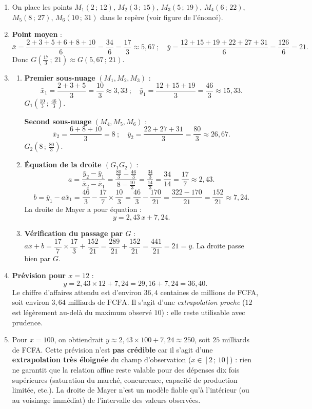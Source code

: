 \documentclass[11pt]{article}
\begin{document}
\begin{corrige}
\begin{enumerate}
    \item On place les points $M_1(2\,;\,12)$, $M_2(3\,;\,15)$, $M_3(5\,;\,19)$, $M_4(6\,;\,22)$, $M_5(8\,;\,27)$, $M_6(10\,;\,31)$ dans le repère (voir figure de l'énoncé).
    \item \textbf{Point moyen} :
    \[ \bar{x}=\frac{2+3+5+6+8+10}{6}=\frac{34}{6}=\frac{17}{3}\approx 5{,}67\ ;\quad \bar{y}=\frac{12+15+19+22+27+31}{6}=\frac{126}{6}=21. \]
    Donc $\boxed{G\left(\frac{17}{3}\,;\,21\right)\approx G(5{,}67\,;\,21)}$.
    \item \begin{enumerate}
        \item \textbf{Premier sous-nuage} $(M_1, M_2, M_3)$ :
        \[ \bar{x}_1=\frac{2+3+5}{3}=\frac{10}{3}\approx 3{,}33\ ;\quad \bar{y}_1=\frac{12+15+19}{3}=\frac{46}{3}\approx 15{,}33. \]
        $\boxed{G_1\left(\frac{10}{3}\,;\,\frac{46}{3}\right)}$.
        
        \textbf{Second sous-nuage} $(M_4, M_5, M_6)$ :
        \[ \bar{x}_2=\frac{6+8+10}{3}=8\ ;\quad \bar{y}_2=\frac{22+27+31}{3}=\frac{80}{3}\approx 26{,}67. \]
        $\boxed{G_2\left(8\,;\,\frac{80}{3}\right)}$.
        \item \textbf{Équation de la droite $(G_1G_2)$} :
        \[ a=\frac{\bar{y}_2-\bar{y}_1}{\bar{x}_2-\bar{x}_1}=\frac{\frac{80}{3}-\frac{46}{3}}{8-\frac{10}{3}}=\frac{\frac{34}{3}}{\frac{14}{3}}=\frac{34}{14}=\frac{17}{7}\approx 2{,}43. \]
        \[ b=\bar{y}_1-a\bar{x}_1=\frac{46}{3}-\frac{17}{7}\times\frac{10}{3}=\frac{46}{3}-\frac{170}{21}=\frac{322-170}{21}=\frac{152}{21}\approx 7{,}24. \]
        La droite de Mayer a pour équation :
        \[ \boxed{y = 2{,}43\,x + 7{,}24}. \]
        \item \textbf{Vérification du passage par $G$} : $a\bar{x}+b = \dfrac{17}{7}\times\dfrac{17}{3}+\dfrac{152}{21}=\dfrac{289}{21}+\dfrac{152}{21}=\dfrac{441}{21}=21=\bar{y}$. La droite passe bien par $G$.
    \end{enumerate}
    \item \textbf{Prévision pour $x=12$} :
    \[ y = 2{,}43\times 12+7{,}24 = 29{,}16+7{,}24 = 36{,}40. \]
    Le chiffre d'affaires attendu est d'environ $36{,}4$ centaines de millions de FCFA, soit $\boxed{\text{environ }3{,}64\text{ milliards de FCFA}}$. Il s'agit d'une \emph{extrapolation proche} ($12$ est légèrement au-delà du maximum observé $10$) : elle reste utilisable avec prudence.
    \item Pour $x=100$, on obtiendrait $y\approx 2{,}43\times 100+7{,}24\approx 250$, soit $25$ milliards de FCFA. Cette prévision n'est \textbf{pas crédible} car il s'agit d'une \textbf{extrapolation très éloignée} du champ d'observation ($x\in[2\,;\,10]$) : rien ne garantit que la relation affine reste valable pour des dépenses dix fois supérieures (saturation du marché, concurrence, capacité de production limitée, etc.). La droite de Mayer n'est un modèle fiable qu'à l'intérieur (ou au voisinage immédiat) de l'intervalle des valeurs observées.
\end{enumerate}


\end{corrige}
\end{document}
